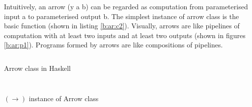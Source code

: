 Intuitively, an arrow (y a b) can be regarded as computation from parameterised input a to parameterised output b. The simplest instance of arrow class is the basic function (shown in listing \ref{b:ar:c2}). Visually, arrows are like pipelines of computation with at least two inputs and at least two outputs (shown in figures \ref{b:ar:p1}\cite{HaskellUnderstandingArrows}). Programs formed by arrows are like compositions of pipelines.
\begin{listing}[ht]
  \inputminted{haskell}{background/ar-def.hs}
  \caption{Arrow class in Haskell}
  \label{b:ar:c1}
\end{listing}
\begin{listing}[ht]
  \inputminted{haskell}{}
\end{listing}
\begin{listing}[ht]
  \inputminted{haskell}{background/ar-func.hs}
  \caption{$(\rightarrow)$ instance of Arrow class} 
  \label{b:ar:c2}
\end{listing}
